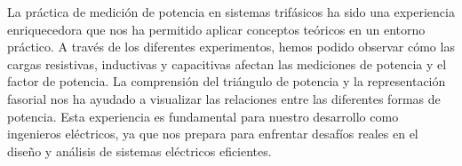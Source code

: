 \documentclass[12pt, letterpaper]{article}
\begin{document}
La práctica de medición de potencia en sistemas trifásicos ha sido una experiencia enriquecedora que nos ha permitido aplicar conceptos teóricos en un entorno práctico. A través de los diferentes experimentos, hemos podido observar cómo las cargas resistivas, inductivas y capacitivas afectan las mediciones de potencia y el factor de potencia. La comprensión del triángulo de potencia y la representación fasorial nos ha ayudado a visualizar las relaciones entre las diferentes formas de potencia. Esta experiencia es fundamental para nuestro desarrollo como ingenieros eléctricos, ya que nos prepara para enfrentar desafíos reales en el diseño y análisis de sistemas eléctricos eficientes.

\end{document}
